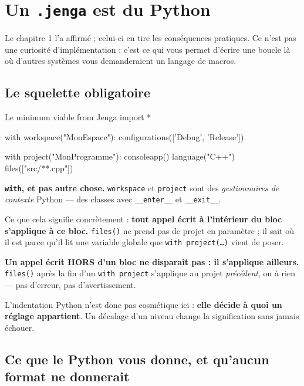 \chapter{Un \texttt{.jenga} est du Python}
\label{ch:python}

Le chapitre 1 l'a affirmé ; celui-ci en tire les conséquences pratiques. Ce
n'est pas une curiosité d'implémentation : c'est ce qui vous permet d'écrire une
boucle là où d'autres systèmes vous demanderaient un langage de macros.

\section{Le squelette obligatoire}

\begin{nkcode}{Le minimum viable}
from Jenga import *

with workspace("MonEspace"):
    configurations(['Debug', 'Release'])

    with project("MonProgramme"):
        consoleapp()
        language("C++")
        files(["src/**.cpp"])
\end{nkcode}

\begin{nkretenir}
\textbf{\texttt{with}, et pas autre chose.} \texttt{workspace} et
\texttt{project} sont des \emph{gestionnaires de contexte} Python --- des classes
avec \texttt{\_\_enter\_\_} et \texttt{\_\_exit\_\_}.

Ce que cela signifie concrètement : \textbf{tout appel écrit à l'intérieur du
bloc s'applique à ce bloc.} \texttt{files()} ne prend pas de projet en
paramètre ; il sait où il est parce qu'il lit une variable globale que
\texttt{with project(\dots)} vient de poser.
\end{nkretenir}

\begin{nkpiege}
\textbf{Un appel écrit HORS d'un bloc ne disparaît pas : il s'applique
ailleurs.} \texttt{files()} après la fin d'un \texttt{with project} s'applique au
projet \emph{précédent}, ou à rien --- pas d'erreur, pas d'avertissement.

L'indentation Python n'est donc pas cosmétique ici : \textbf{elle décide à quoi
un réglage appartient}. Un décalage d'un niveau change la signification sans
jamais échouer.
\end{nkpiege}

\section{Ce que le Python vous donne, et qu'aucun format ne donnerait}


